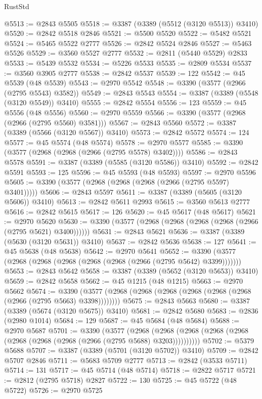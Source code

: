 \begin{lexlean}{RustStd}
\begin{coremodule}
{\begin{coremodule}
{{{{{{{{{{{{{{{{{{{{{{{{{{{{{{{{{@5513 := @2843 @5505
@5518 := @3387 (@3389 (@5512 (@3120 @5513)) @3410)
@5520 := @2842 @5518 @2846
@5521 := @5500 @5520
@5522 := @5482 @5521
@5524 := @5465 @5522 @2777
@5526 := @2842 @5524 @2846
@5527 := @5463 @5526
@5529 := @3560 @5527 @2777
@5532 := @2811 (@5440 @5529) @2833
@5533 := @5439 @5532
@5534 := @5226 @5533
@5535 := @2809 @5534
@5537 := @3560 @3905 @2777
@5538 := @2842 @5537
@5539 := 122
@5542 := @45 @5539 (@48 @5539)
@5543 := @2970 @5542
@5548 := @3390 (@3577 (@2966 (@2795 @5543) @3582))
@5549 := @2843 @5543
@5554 := @3387 (@3389 (@5548 (@3120 @5549)) @3410)
@5555 := @2842 @5554
@5556 := 123
@5559 := @45 @5556 (@48 @5556)
@5560 := @2970 @5559
@5566 := @3390 (@3577 (@2968 (@2966 (@2795 @5560) @3581)))
@5567 := @2843 @5560
@5572 := @3387 (@3389 (@5566 (@3120 @5567)) @3410)
@5573 := @2842 @5572
@5574 := 124
@5577 := @45 @5574 (@48 @5574)
@5578 := @2970 @5577
@5585 := @3390 (@3577 (@2968 (@2968 (@2966 (@2795 @5578) @3402))))
@5586 := @2843 @5578
@5591 := @3387 (@3389 (@5585 (@3120 @5586)) @3410)
@5592 := @2842 @5591
@5593 := 125
@5596 := @45 @5593 (@48 @5593)
@5597 := @2970 @5596
@5605 := @3390 (@3577 (@2968 (@2968 (@2968 (@2966 (@2795 @5597) @3401)))))
@5606 := @2843 @5597
@5611 := @3387 (@3389 (@5605 (@3120 @5606)) @3410)
@5613 := @2842 @5611 @2993
@5615 := @3560 @5613 @2777
@5616 := @2842 @5615
@5617 := 126
@5620 := @45 @5617 (@48 @5617)
@5621 := @2970 @5620
@5630 := @3390 (@3577 (@2968 (@2968 (@2968 (@2968 (@2966 (@2795 @5621) @3400))))))
@5631 := @2843 @5621
@5636 := @3387 (@3389 (@5630 (@3120 @5631)) @3410)
@5637 := @2842 @5636
@5638 := 127
@5641 := @45 @5638 (@48 @5638)
@5642 := @2970 @5641
@5652 := @3390 (@3577 (@2968 (@2968 (@2968 (@2968 (@2968 (@2966 (@2795 @5642) @3399)))))))
@5653 := @2843 @5642
@5658 := @3387 (@3389 (@5652 (@3120 @5653)) @3410)
@5659 := @2842 @5658
@5662 := @45 @1215 (@48 @1215)
@5663 := @2970 @5662
@5674 := @3390 (@3577 (@2968 (@2968 (@2968 (@2968 (@2968 (@2968 (@2966 (@2795 @5663) @3398))))))))
@5675 := @2843 @5663
@5680 := @3387 (@3389 (@5674 (@3120 @5675)) @3410)
@5681 := @2842 @5680
@5683 := @2836 (@2980 @1014)
@5684 := 129
@5687 := @45 @5684 (@48 @5684)
@5688 := @2970 @5687
@5701 := @3390
    (@3577
      (@2968 (@2968 (@2968 (@2968 (@2968 (@2968 (@2968 (@2968 (@2966 (@2795 @5688) @3203))))))))))
@5702 := @5379 @5688
@5707 := @3387 (@3389 (@5701 (@3120 @5702)) @3410)
@5709 := @2842 @5707 @2846
@5711 := @5683 @5709 @2777
@5713 := @2842 (@3533 @5711)
@5714 := 131
@5717 := @45 @5714 (@48 @5714)
@5718 := @2822 @5717
@5721 := @2812 (@2795 @5718) @2827
@5722 := 130
@5725 := @45 @5722 (@48 @5722)
@5726 := @2970 @5725
}}}}}}}}}}}}}}}}}}}}}}}}}}}}}}}}}
\end{coremodule}}
\end{coremodule}
\end{lexlean}
